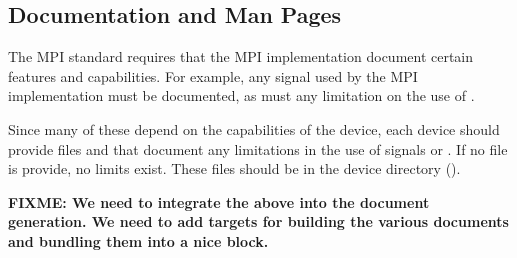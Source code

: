 \documentclass{article}
\def\fixme#1{\marginpar{FIXME:}\textbf{FIXME: #1}}
\begin{document}


\subsection{Documentation and Man Pages}
The MPI standard requires that the MPI implementation document certain
features and capabilities.  For example, any signal used by the MPI
implementation must be documented, as must any limitation on the use of
.  

Since many of these depend on the capabilities of the device, each device
should provide files  and  that
document any limitations in the use of signals or .  If
no file is provide, no limits exist.  These files should be in the device
directory ().

\fixme{We need to integrate the above into the document generation.
  We need to add targets for building the various documents and
  bundling them into a nice block.}

\end{document}
